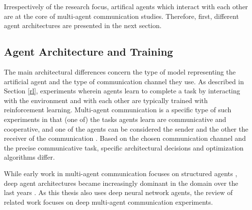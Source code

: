Irrespectively of the research focus, artifical agents which interact with each other are at the core of multi-agent communication studies. Therefore, first, different agent architectures are presented in the next section.


\subsection{Agent Architecture and Training}

The main architectural differences concern the type of model representing the artificial agent and the type of communication channel they use.
As described in Section \ref{rl}, experiments wherein agents learn to complete a task by interacting with the environment and with each other are typically trained with reinforcement learning. Multi-agent communication is a specific type of such experiments in that (one of) the tasks agents learn are communicative and cooperative, and one of the agents can be considered the sender and the other the receiver of the communication \parencite[cf.][]{tan1993multi, lazaridou2016multi}.
Based on the chosen communication channel and the precise communicative task, specific architectural decisions and optimization algorithms differ. 

While early work in multi-agent communication focuses on structured agents \parencite[e. g., see][for reviews]{christiansen2003language, cangelosi2002symbol}, deep agent architectures became increasingly dominant in the domain over the last years \parencite{lazaridou2020emergent}. As this thesis also uses deep neural network agents, the review of related work focuses on deep multi-agent communication experiments. 


